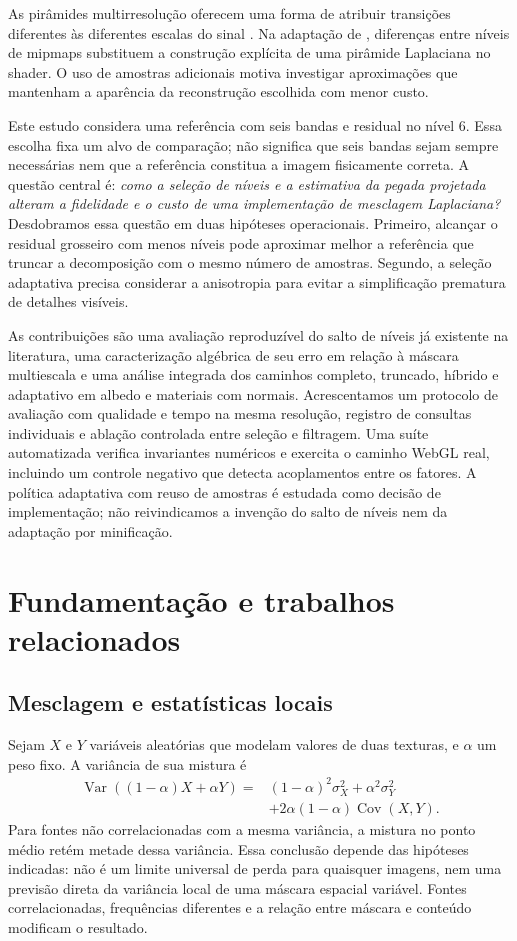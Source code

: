 As pirâmides multirresolução oferecem uma forma de atribuir transições diferentes às diferentes escalas do sinal \citep{burt1983laplacian,burt1983spline}. Na adaptação de \citet{wronski2025laplacian}, diferenças entre níveis de mipmaps substituem a construção explícita de uma pirâmide Laplaciana no shader. O uso de amostras adicionais motiva investigar aproximações que mantenham a aparência da reconstrução escolhida com menor custo.

Este estudo considera uma referência com seis bandas e residual no nível 6. Essa escolha fixa um alvo de comparação; não significa que seis bandas sejam sempre necessárias nem que a referência constitua a imagem fisicamente correta. A questão central é: \emph{como a seleção de níveis e a estimativa da pegada projetada alteram a fidelidade e o custo de uma implementação de mesclagem Laplaciana?} Desdobramos essa questão em duas hipóteses operacionais. Primeiro, alcançar o residual grosseiro com menos níveis pode aproximar melhor a referência que truncar a decomposição com o mesmo número de amostras. Segundo, a seleção adaptativa precisa considerar a anisotropia para evitar a simplificação prematura de detalhes visíveis.

As contribuições são uma avaliação reproduzível do salto de níveis já existente na literatura, uma caracterização algébrica de seu erro em relação à máscara multiescala e uma análise integrada dos caminhos completo, truncado, híbrido e adaptativo em albedo e materiais com normais. Acrescentamos um protocolo de avaliação com qualidade e tempo na mesma resolução, registro de consultas individuais e ablação controlada entre seleção e filtragem. Uma suíte automatizada verifica invariantes numéricos e exercita o caminho WebGL real, incluindo um controle negativo que detecta acoplamentos entre os fatores. A política adaptativa com reuso de amostras é estudada como decisão de implementação; não reivindicamos a invenção do salto de níveis nem da adaptação por minificação.

\section{Fundamentação e trabalhos relacionados}
\subsection{Mesclagem e estatísticas locais}
Sejam $X$ e $Y$ variáveis aleatórias que modelam valores de duas texturas, e $\alpha$ um peso fixo. A variância de sua mistura é
\begin{align}
\operatorname{Var}((1-\alpha)X+\alpha Y)
={}&(1-\alpha)^2\sigma_X^2+\alpha^2\sigma_Y^2\nonumber\\
&+2\alpha(1-\alpha)\operatorname{Cov}(X,Y).
\label{eq:variance}
\end{align}
Para fontes não correlacionadas com a mesma variância, a mistura no ponto médio retém metade dessa variância. Essa conclusão depende das hipóteses indicadas: não é um limite universal de perda para quaisquer imagens, nem uma previsão direta da variância local de uma máscara espacial variável. Fontes correlacionadas, frequências diferentes e a relação entre máscara e conteúdo modificam o resultado.

